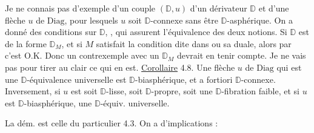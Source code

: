 Je ne connais pas d'exemple d'un couple $(\mathbb{D},u)$ d'un dérivateur $\mathbb{D}$ et d'une flèche $u$ de $\mathrm{Diag}$, pour lesquels $u$ soit $\mathbb{D}$-connexe sans être $\mathbb{D}$-asphérique. On a donné des conditions sur $\mathbb{D}$, , qui assurent l'équivalence des deux notions. Si $\mathbb{D}$ est de la forme $\mathbb{D}_M$, et si  $M$ satisfait la condition dite dans  ou sa duale, alors par  c'est O.K. Donc un contrexemple avec un $\mathbb{D}_M$ devrait en tenir compte. Je ne vais pas  pour tirer au clair ce qui en est.
\uline{Corollaire} 4.8. Une flèche $u$ de $\mathrm{Diag}$ qui est une $\mathbb{D}$-équivalence universelle est $\mathbb{D}$-biasphérique, et a fortiori $\mathbb{D}$-connexe. Inversement, si $u$ est soit $\mathbb{D}$-lisse, soit $\mathbb{D}$-propre, soit une $\mathbb{D}$-fibration faible, et si $u$ est $\mathbb{D}$-biasphérique,  une $\mathbb{D}$-équiv. universelle.

La dém. est celle du  particulier 4.3. On a   d'implications :



